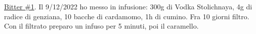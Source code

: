 \serves{-}%
\begin{ingreds}




\end{ingreds}

\begin{method}
\underline{Bitter \#1}. Il 9/12/2022 ho messo in infusione: 300g di Vodka Stolichnaya, 4g di radice di genziana, 10 bacche di cardamomo, 1h di cumino. Fra 10 giorni filtro. Con il filtrato preparo un infuso per 5 minuti, poi il caramello.

\end{method}




